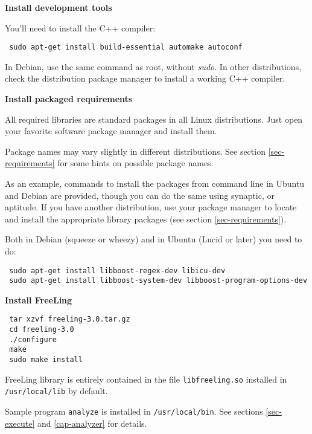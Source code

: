 \documentclass[a4paper]{book}
\begin{document}
\begin{list}{{\bf {}.}}{\leftmargin=1.5em}

\item {\bf Install development tools}

 You'll need to install the C++ compiler:
\begin{verbatim}
 sudo apt-get install build-essential automake autoconf
\end{verbatim}
  In Debian, use the same command as root, without {\sl sudo}.  In
  other distributions, check the distribution package manager to
  install a working C++ compiler.

\item {\bf Install packaged requirements}

 All required libraries are standard packages in all Linux
 distributions.  Just open your favorite software package manager and
 install them.

  Package names may vary slightly in different distributions. See
  section \ref{sec-requirements} for some hints on possible package
  names.

  As an example, commands to install the packages from command line in
  Ubuntu and Debian are provided, though you can do the same using
  synaptic, or aptitude.
  If you have another distribution, use your package manager to locate
  and install the appropriate library packages (see section
  \ref{sec-requirements}).

  Both in Debian (squeeze or wheezy) and in Ubuntu (Lucid or later)
  you need to do:
\begin{verbatim}
 sudo apt-get install libboost-regex-dev libicu-dev
 sudo apt-get install libboost-system-dev libboost-program-options-dev
\end{verbatim}

\item {\bf Install FreeLing}

\begin{verbatim}
 tar xzvf freeling-3.0.tar.gz
 cd freeling-3.0
 ./configure
 make
 sudo make install
\end{verbatim}

  FreeLing library is entirely contained in the file {\tt libfreeling.so}
 installed in {\tt /usr/local/lib} by default.

 Sample program {\tt analyze} is installed in {\tt /usr/local/bin}. 
 See sections \ref{sec-execute} and \ref{cap-analyzer} for details.
\end{list}
\end{document}
